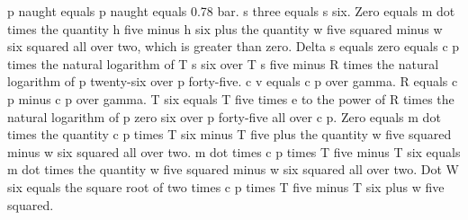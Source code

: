 p naught equals p naught equals 0.78 bar.
s three equals s six.
Zero equals m dot times the quantity h five minus h six plus the quantity w five squared minus w six squared all over two, which is greater than zero.
Delta s equals zero equals c p times the natural logarithm of T s six over T s five minus R times the natural logarithm of p twenty-six over p forty-five.
c v equals c p over gamma.
R equals c p minus c p over gamma.
T six equals T five times e to the power of R times the natural logarithm of p zero six over p forty-five all over c p.
Zero equals m dot times the quantity c p times T six minus T five plus the quantity w five squared minus w six squared all over two.
m dot times c p times T five minus T six equals m dot times the quantity w five squared minus w six squared all over two.
Dot W six equals the square root of two times c p times T five minus T six plus w five squared.